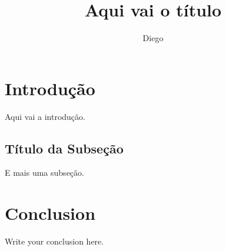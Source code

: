 \documentclass[a4paper,12pt]{report}
\begin{document}
\title{Aqui vai o título}
\author{Diego}

\maketitle
\tableofcontents


\section{Introdução}
Aqui vai a introdução.


\subsection{Título da Subseção}
E mais uma subseção.


\section{Conclusion}
Write your conclusion here.
\end{document}
